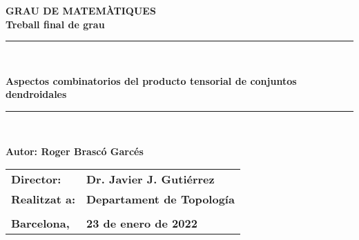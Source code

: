 \documentclass[11pt,a4paper,openright,oneside]{article}
\numberwithin{equation}{section}
\theoremstyle{definition}
\begin{document}
\thispagestyle{empty}


\begin{titlepage}
    \begin{center}
        \begin{figure}[htb]
            \begin{center}
            \end{center}
        \end{figure}
        \vspace*{1cm}
        \textbf{\LARGE GRAU DE MATEM\`{A}TIQUES } \\
        \vspace*{.5cm}
        \textbf{\LARGE Treball final de grau} \\
        \vspace*{1.5cm}
        \rule{16cm}{0.1mm}\\
        \begin{Huge}
            \textbf{Aspectos combinatorios del producto tensorial de conjuntos dendroidales} \\
        \end{Huge}
        \rule{16cm}{0.1mm}\\
        \vspace{1cm}
        \begin{flushright}
            \textbf{\LARGE Autor: Roger Brasc\'o Garc\'es}
            \vspace*{2cm}
            \renewcommand{\arraystretch}{1.5}
            \begin{tabular}{ll}
                \textbf{\Large Director:}    & \textbf{\Large Dr. Javier J. Guti\'errez }  \\
                \textbf{\Large Realitzat a:} & \textbf{\Large  Departament de Topolog\'ia} \\
                \\
                \textbf{\Large Barcelona,}   & \textbf{\Large 23 de enero de 2022 }
            \end{tabular}
        \end{flushright}
    \end{center}
\end{titlepage}
\newpage
\end{document}
